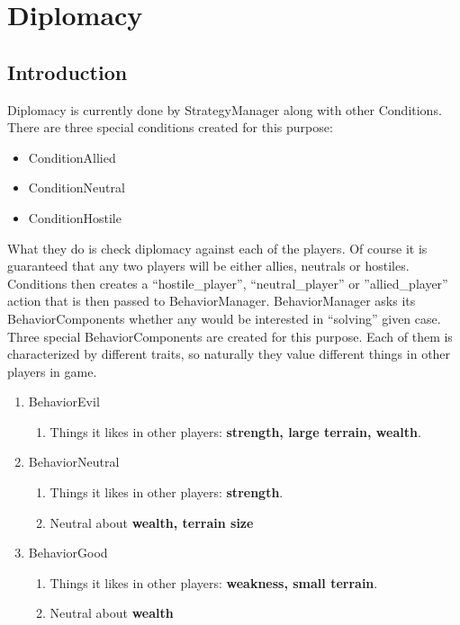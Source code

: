 \section{Diplomacy}
\subsection{Introduction}
	Diplomacy is currently done by StrategyManager along with other Conditions.
	There are three special conditions created for this purpose:
	\begin{itemize}
		\item ConditionAllied
		\item ConditionNeutral
		\item ConditionHostile
	\end{itemize}
	What they do is check diplomacy against each of the players. Of course it is guaranteed that any two players will be either allies, neutrals or hostiles. Conditions then creates a ``hostile\_player'', ``neutral\_player'' or ''allied\_player'' action that is then passed to BehaviorManager. 
	BehaviorManager asks its BehaviorComponents whether any would be interested in ``solving'' given case. Three special BehaviorComponents are created for this purpose. Each of them is characterized by different traits, so naturally they value different things in other players in game.
	\begin{enumerate}
		\item BehaviorEvil
			\begin{enumerate}
				\item Things it likes in other players: \textbf{strength, large terrain, wealth}.
			\end{enumerate}
		\item BehaviorNeutral
			\begin{enumerate}
				\item Things it likes in other players: \textbf{strength}.
				\item Neutral about \textbf{wealth, terrain size}
			\end{enumerate}
		\item BehaviorGood
			\begin{enumerate}
				\item Things it likes in other players: \textbf{weakness, small terrain}.
				\item Neutral about \textbf{wealth}
			\end{enumerate}
	\end{enumerate}

